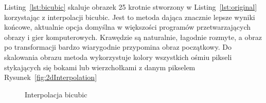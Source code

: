 \documentclass[12pt, a4paper]{article}
\begin{document}
Listing~\ref{lst:bicubic} skaluje obrazek 25 krotnie stworzony w Listing~\ref{lst:original} korzystając z interpolacji bicubic. Jest to   metoda dająca znacznie lepsze wyniki końcowe, aktualnie opcja domyślna w większości programów przetwarzających obrazy i gier komputerowych. Krawędzie są naturalnie, łagodnie rozmyte, a obraz po transformacji bardzo wiarygodnie przypomina obraz początkowy. Do skalowania obrazu metoda wykorzystuje kolory wszystkich ośmiu pikseli stykających się bokami lub wierzchołkami z danym pikselem Rysunek~\ref{fig:2dInterpolation}
\begin{figure}[ht!]
	\centering    
	\def\svgwidth{\columnwidth}
	
	\caption{Interpolacja bicubic}
	\label{fig:bicubic}
\end{figure}
\end{document}
